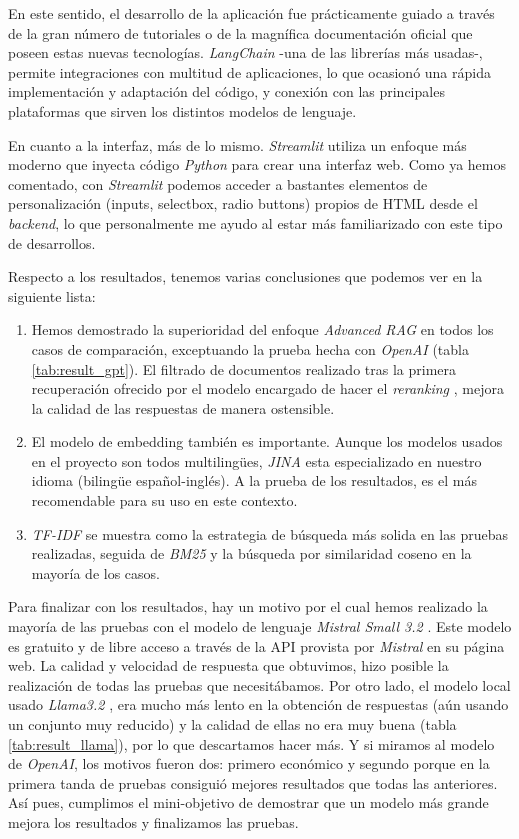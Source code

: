 		\noindent En este sentido, el desarrollo de la aplicación fue prácticamente guiado a través de la gran número de tutoriales o de la magnífica documentación oficial que poseen estas nuevas tecnologías. \textit{LangChain} -una de las librerías más usadas-, permite integraciones con multitud de aplicaciones, lo que ocasionó una rápida implementación y adaptación del código, y conexión con las principales plataformas que sirven los distintos modelos de lenguaje. 
		
		\noindent En cuanto a la interfaz, más de lo mismo. \textit{Streamlit} utiliza un enfoque más moderno que inyecta código \textit{Python} para crear una interfaz web. Como ya hemos comentado, con \textit{Streamlit} podemos acceder a bastantes elementos de personalización (inputs, selectbox, radio buttons) propios de HTML desde el \textit{backend}, lo que personalmente me ayudo al estar más familiarizado con este tipo de desarrollos.
		
		\noindent Respecto a los resultados, tenemos varias conclusiones que podemos ver en la siguiente lista:
		
		\begin{enumerate}
			\item Hemos demostrado la superioridad del enfoque \textit{Advanced RAG} en todos los casos de comparación, exceptuando la prueba hecha con \textit{OpenAI} (tabla \ref{tab:result_gpt}). El filtrado de documentos realizado tras la primera recuperación ofrecido por el modelo encargado de hacer el \textit{reranking} \cite{0036_bge_reranker}, mejora la calidad de las respuestas de manera ostensible.
			\item El modelo de embedding también es importante. Aunque los modelos usados en el proyecto son todos multilingües, \textit{JINA} \cite{0027_jina} esta especializado en nuestro idioma (bilingüe español-inglés). A la prueba de los resultados, es el más recomendable para su uso en este contexto.
			\item \textit{TF-IDF} se muestra como la estrategia de búsqueda más solida en las pruebas realizadas, seguida de \textit{BM25} y la búsqueda por similaridad coseno en la mayoría de los casos.			
		\end{enumerate}
		
		\noindent Para finalizar con los resultados, hay un motivo por el cual hemos realizado la mayoría de las pruebas con el modelo de lenguaje \textit{Mistral Small 3.2} \cite{0038_mistralsmall32}. Este modelo es gratuito y de libre acceso a través de la API provista por \textit{Mistral} en su página web. La calidad y velocidad de respuesta que obtuvimos, hizo posible la realización de todas las pruebas que necesitábamos. Por otro lado, el modelo local usado \textit{Llama3.2} \cite{0037_llama32}, era mucho más lento en la obtención de respuestas (aún usando un conjunto muy reducido) y la calidad de ellas no era muy buena (tabla \ref{tab:result_llama}), por lo que descartamos hacer más. Y si miramos al modelo de \textit{OpenAI}, los motivos fueron dos: primero económico y segundo porque en la primera tanda de pruebas consiguió mejores resultados que todas las anteriores. Así pues, cumplimos el mini-objetivo de demostrar que un modelo más grande mejora los resultados y finalizamos las pruebas.
		
